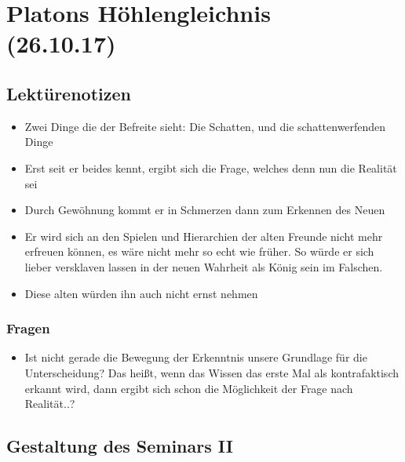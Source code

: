 \documentclass[emulatestandardclasses]{scrartcl}
\begin{document}
\section{Platons Höhlengleichnis\\(26.10.17)}

\subsection{Lektürenotizen}

\begin{itemize}
  \item Zwei Dinge die der Befreite sieht: Die Schatten, und die schattenwerfenden Dinge
  \item Erst seit er beides kennt, ergibt sich die Frage, welches denn nun die Realität sei
  \item Durch Gewöhnung kommt er in Schmerzen dann zum Erkennen des Neuen
  \item Er wird sich an den Spielen und Hierarchien der alten Freunde nicht mehr erfreuen können, es wäre nicht mehr so echt wie früher. So würde er sich lieber versklaven lassen in der neuen Wahrheit als König sein im Falschen.
  \item Diese alten würden ihn auch nicht ernst nehmen
\end{itemize}

\subsubsection{Fragen}

\begin{itemize}
  \item Ist nicht gerade die Bewegung der Erkenntnis unsere Grundlage für die Unterscheidung? Das heißt, wenn das Wissen das erste Mal als kontrafaktisch erkannt wird, dann ergibt sich schon die Möglichkeit der Frage nach Realität..?
\end{itemize}

\subsection{Gestaltung des Seminars II}
\end{document}
